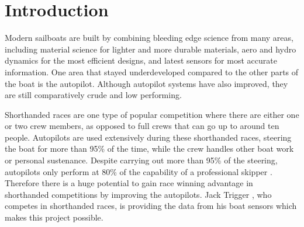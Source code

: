 \documentclass[12pt,twoside]{report}
\date{May 2021}
\begin{document}



\pagestyle{fancy}

\tableofcontents 


\clearpage{\pagestyle{empty}%
}
\fancyhead[LE,RO]{\slshape \rightmark}
\fancyhead[LO,RE]{\slshape \leftmark}


\chapter{Introduction}


Modern sailboats are built by combining bleeding edge science from many areas, including material science for lighter and more durable materials, aero and hydro dynamics for the most efficient designs, and latest sensors for most accurate information. One area that stayed underdeveloped compared to the other parts of the boat is the autopilot. Although autopilot systems have also improved, they are still comparatively crude and low performing.

Shorthanded races are one type of popular competition where there are either one or two crew members, as opposed to full crews that can go up to around ten people. Autopilots are used extensively during these shorthanded races, steering the boat for more than 95\% of the time, while the crew handles other boat work or personal sustenance. Despite carrying out more than 95\% of the steering, autopilots only perform at 80\% of the capability of a professional skipper \cite{roman}. Therefore there is a huge potential to gain race winning advantage in shorthanded competitions by improving the autopilots. Jack Trigger \cite{trigger-racing}, who competes in shorthanded races, is providing the data from his boat sensors which makes this project possible. 
\end{document}
